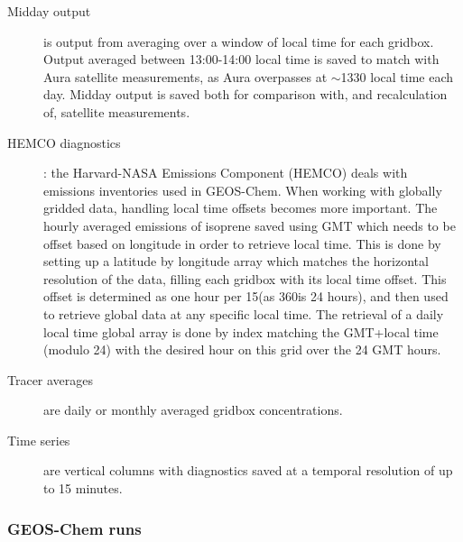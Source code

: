       \begin{description}
        \item[Midday output]%
          is output from averaging over a window of local time for each gridbox. 
          Output averaged between 13:00-14:00 local time is saved to match with Aura satellite measurements, as Aura overpasses at $\sim$1330 local time each day.
          Midday output is saved both for comparison with, and recalculation of, satellite measurements.
          \item[HEMCO diagnostics]:%
          the Harvard-NASA Emissions Component (HEMCO) deals with emissions inventories used in GEOS-Chem.
          When working with globally gridded data, handling local time offsets becomes more important.
          The hourly averaged emissions of isoprene saved using GMT which needs to be offset based on longitude in order to retrieve local time.
          This is done by setting up a latitude by longitude array which matches the horizontal resolution of the data, filling each gridbox with its local time offset.
          This offset is determined as one hour per 15\degr (as 360\degr is 24 hours), and then used to retrieve global data at any specific local time.
          The retrieval of a daily local time global array is done by index matching the GMT+local time (modulo 24) with the desired hour on this grid over the 24 GMT hours.
        \item[Tracer averages]%
          are daily or monthly averaged gridbox concentrations. 
        \item[Time series]%
          are vertical columns with diagnostics saved at a temporal resolution of up to 15 minutes.
        
        
      \end{description}
    
    \subsubsection{GEOS-Chem runs}
      \label{Model:GC:simulations:runs}
      
